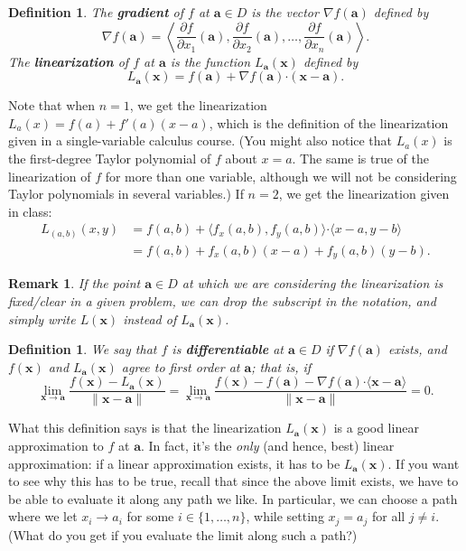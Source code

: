 \documentclass[12pt,letterpaper]{article}
\newtheorem{rem}[theorem]{Remark}
\newenvironment{remark}{\begin{rem}\rm}{\end{rem}}
\newtheorem{definition}[theorem]{Definition}
\newcommand{\x}{\mathbf{x}}
\newcommand{\aaa}{\mathbf{a}}
\newcommand{\dotp}{\boldsymbol{\cdot}}
\begin{document}
\begin{definition}
 The {\bf gradient} of $f$ at $\aaa\in D$ is the vector $\nabla f(\aaa)$ defined by
 \[
 \nabla f(\aaa) = \left< \frac{\partial f}{\partial x_1}(\aaa),\frac{\partial f}{\partial x_2}(\aaa),\ldots, \frac{\partial f}{\partial x_n}(\aaa)\right>.
 \]
 The {\bf linearization} of $f$ at $\aaa$ is the function $L_\aaa(\x)$ defined by
 \[
 L_\aaa(\x) = f(\aaa) + \nabla f(\aaa)\dotp (\x-\aaa).
 \]
\end{definition}
Note that when $n=1$, we get the linearization $L_a(x) = f(a)+f'(a)(x-a)$, which is the definition of the linearization given in a single-variable calculus course. (You might also notice that $L_a(x)$ is the first-degree Taylor polynomial of $f$ about $x=a$. The same is true of the linearization of $f$ for more than one variable, although we will not be considering Taylor polynomials in several variables.) If $n=2$, we get the linearization given in class:
\begin{align*}
L_{(a,b)}(x,y) &= f(a,b)+\langle f_x(a,b),f_y(a,b)\rangle\dotp \langle x-a,y-b\rangle\\
& = f(a,b) + f_x(a,b)(x-a)+f_y(a,b)(y-b).
\end{align*}
\begin{remark}
If the point $\aaa\in D$ at which we are considering the linearization is fixed/clear in a given problem, we can drop the subscript in the notation, and simply write $L(\x)$ instead of $L_\aaa(\x)$.
\end{remark}
\begin{definition}\label{dif}
We say that $f$ is {\bf differentiable} at $\aaa\in D$ if $\nabla f(\aaa)$ exists, and $f(\x)$ and $L_\aaa(\x)$ agree to first order at $\aaa$; that is, if
\[
\lim_{\x\to \aaa}\frac{f(\x)-L_\aaa(\x)}{\lVert \x-\aaa\rVert} = \lim_{\x\to\aaa}\frac{f(\x)-f(\aaa)-\nabla f(\aaa)\dotp \langle \x-\aaa\rangle}{\lVert\x - \aaa\rVert} = 0.
\]
\end{definition}
What this definition says is that the linearization $L_\aaa(\x)$ is a good linear approximation to $f$ at $\aaa$. In fact, it's the {\em only} (and hence, best) linear approximation: if a linear approximation exists, it has to be $L_\aaa(\x)$. If you want to see why this has to be true, recall that since the above limit exists, we have to be able to evaluate it along any path we like. In particular, we can choose a path where we let $x_i\to a_i$ for some $i\in\{1,\ldots, n\}$, while setting $x_j=a_j$ for all $j\neq i$. (What do you get if you evaluate the limit along such a path?)
\end{document}
